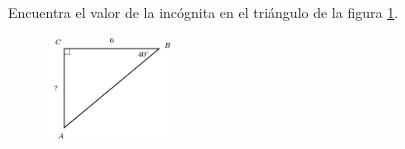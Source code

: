 Encuentra el valor de la incógnita en el triángulo de la figura \ref{fig:lados_functrig_21}.
\begin{figure}[H]
    \begin{center}
        \includegraphics[width=0.3\textwidth]{../images/lados_functrig_21.png}
    \end{center}
    \caption{}
    \label{fig:lados_functrig_21}
\end{figure}